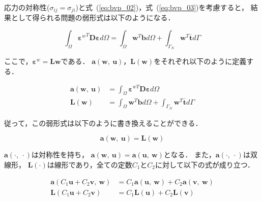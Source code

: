 \noindent
応力の対称性($\sigma_{ij} = \sigma_{ji}$)と式~(\ref{eq:bvp_02})，式~(\ref{eq:bvp_03})を考慮すると，
結果として得られる問題の弱形式は以下のようになる．

\begin{equation}
  \label{eq:weak_form}
  \int_\Omega {\boldsymbol{\varepsilon}^{w}}^{T} \boldsymbol{D}\boldsymbol{\varepsilon} d\Omega = \int_\Omega \boldsymbol{w}^T \boldsymbol{b} d\Omega + \int_{\Gamma_N} \boldsymbol{w}^T \overline{\boldsymbol{t}} d\Gamma
\end{equation}

\noindent
ここで，$\boldsymbol{\varepsilon}^{w} = \boldsymbol{L}\boldsymbol{w}$である．
$\boldsymbol{a}(\boldsymbol{w},\ \boldsymbol{u})$，$\boldsymbol{L}(\boldsymbol{w})$をそれぞれ以下のように定義する．

\begin{align}
  \boldsymbol{a}(\boldsymbol{w},\ \boldsymbol{u}) &= \int_\Omega \boldsymbol{\varepsilon}^{wT} \boldsymbol{D}\boldsymbol{\varepsilon} d\Omega\\
  \boldsymbol{L}(\boldsymbol{w}) &= \int_\Omega \boldsymbol{w}^T \boldsymbol{b} d\Omega + \int_{\Gamma_N} \boldsymbol{w}^T \overline{\boldsymbol{t}} d\Gamma
\end{align}

\noindent
従って，この弱形式は以下のように書き換えることができる．

\begin{equation}
  \label{eq:weak_Galerkin}
  \boldsymbol{a}(\boldsymbol{w},\ \boldsymbol{u})=\boldsymbol{L}(\boldsymbol{w})
\end{equation}

\noindent
$\boldsymbol{a}(\cdot,\ \cdot)$は対称性を持ち，
$\boldsymbol{a}(\boldsymbol{w},\ \boldsymbol{u})=\boldsymbol{a}(\boldsymbol{u},\ \boldsymbol{w})$となる．
また，$\boldsymbol{a}(\cdot,\ \cdot)$は双線形，
$\boldsymbol{L}(\cdot)$は線形であり，全ての定数$C_1$と$C_2$に対して以下の式が成り立つ．

\begin{align}
  \boldsymbol{a} (C_1 \boldsymbol{u} + C_2 \boldsymbol{v},\ \boldsymbol{w}) &= C_1 \boldsymbol{a} (\boldsymbol{u},\ \boldsymbol{w}) + C_2 \boldsymbol{a} (\boldsymbol{v},\ \boldsymbol{w})\\
  \boldsymbol{L} (C_1 \boldsymbol{u} + C_2 \boldsymbol{v}) &= C_1 \boldsymbol{L} (\boldsymbol{u}) + C_2 \boldsymbol{L} (\boldsymbol{v})
\end{align}

\newpage

